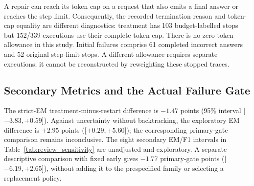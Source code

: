 \documentclass{article}
\begin{document}
\begin{table}[h]
\centering\footnotesize
\caption{Exploratory mean recovery usage per attempted repair, on 113
questions and three seeds. F/B/S are counts terminating with an answer,
at the token budget, or at the new-step limit; each row sums to 339.
Prompt and output tokens are separate quantities, not an estimate of FLOPs.}
\label{tab:review_costs}

\end{table}

A repair can reach its token cap on a request that also emits a final
answer or reaches the step limit. Consequently, the recorded termination
reason and token-cap equality are different diagnostics: treatment has
103 budget-labelled stops but 152/339 executions use their complete token
cap. There is no zero-token allowance in this study. Initial failures
comprise 61 completed incorrect answers and 52 original step-limit stops.
A different allowance requires separate executions; it cannot
be reconstructed by reweighting these stopped traces.

\subsection{Secondary Metrics and the Actual Failure Gate}
The strict-EM treatment-minus-restart difference is $-1.47$ points
(95\% interval [$-3.83,+0.59$]). Against uncertainty without backtracking,
the exploratory EM difference is $+2.95$ points ([$+0.29,+5.60$]); the
corresponding primary-gate comparison remains inconclusive. The eight
secondary EM/F1 intervals in Table~\ref{tab:review_sensitivity} are unadjusted
and exploratory. A separate descriptive comparison with fixed early gives
$-1.77$ primary-gate points ([$-6.19,+2.65$]), without adding it to the
prespecified family or selecting a replacement policy.

\begin{table}[h]
\centering\footnotesize
\caption{Exploratory treatment-minus-control differences on the same 113
initial failures. Individual 95\% question-bootstrap intervals are not
adjusted for the eight secondary comparisons. EM is in percentage points;
F1 differences are multiplied by 100. The original primary tests use the
answer-success gate, not these metrics.}
\label{tab:review_sensitivity}

\end{table}

\begin{table}[h]
\centering\small
\caption{Outcomes over all 250 questions under the implemented reference
gate: preserve initially accepted answers and apply one sampled repair only
to the original 113 failures. Three seeds estimate that repair's mean
outcome. Initial rates were 54.80\% gate success, 38.80\% EM and 0.5164 F1.
These are not outcomes of an EM-only rerun or a deployed failure detector.}
\label{tab:review_population}

\end{table}
\end{document}
